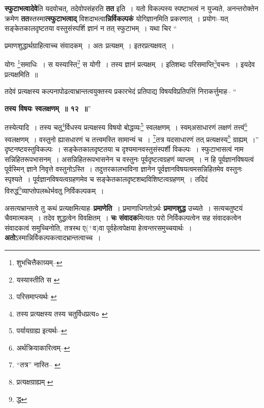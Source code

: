 \documentclass[article,12pt,a4paper]{memoir}
\newcommand{\add}[1]{($^{+}$#1)}
\begin{document}
	  \pstart \textbf{स्फुटाभत्वादेवे}ति यदवोचत्, तदेवोपसंहरति \textbf{तत} इति । यतो विकल्पस्य स्पष्टाभत्वं न युज्यते, अनन्तरोक्तेन क्रमेण \textbf{तत}स्तस्मा\textbf{त्स्फुटाभत्वाद्} विशदाभत्वा\textbf{न्निर्विकल्पकं} योगिज्ञानमिति प्रकरणात् । प्रयोगः--यत् सङ्केतकालदृष्टतया वस्तुसंस्पर्शि ज्ञानं न तत् स्फुटाभम् । यथा चिर \leavevmode{} “
	  
	प्रमाणशुद्धार्थग्राहित्वाच्च संवादकम् । अतः प्रत्यक्षम् । इतरप्रत्यक्षवत् । 
	  
	योगः \footnote{शुभचित्तैकाग्र्यम्--\cite{dp-msD-n}}समाधिः । स यस्यास्ति\footnote{यस्यास्तीति स \cite{dp-msC}} स योगी । तस्य ज्ञानं प्रत्यक्षम् । इतिशब्दः परिसमाप्ति\footnote{परिसमाप्त्यर्थः \cite{dp-msA} \cite{dp-edP} \cite{dp-edH} \cite{dp-edE} \cite{dp-edN}}वचनः । इयदेव प्रत्यक्षमिति ॥ 
	  
	तदेवं प्रत्यक्षस्य कल्पनापोढत्वाभ्रान्तत्वयुक्तस्य प्रकारभेदं प्रतिपाद्य विषयविप्रतिपत्तिं निराकर्त्तुमाह-- “
	  
	\textbf{तस्य विषयः स्वलक्षणम् ॥ १२ ॥}” 
	  
	तस्येत्यादि । तस्य चतु\footnote{तस्य प्रत्यक्षस्य \cite{dp-msC} तस्य चतुर्विधप्रत्य० \cite{dp-msA} \cite{dp-edP} \cite{dp-edH} \cite{dp-edE} \cite{dp-edN}}र्विधस्य प्रत्यक्षस्य विषयो बोद्धव्यः\footnote{पर्यायग्राह्य इत्यर्थः--\cite{dp-msD-n}} स्वलक्षणम् । स्वम्असाधारणं लक्षणं तत्त्वं\footnote{अर्थक्रियाकारित्वम्--\cite{dp-msD-n}} स्वलक्षणम् । वस्तुनो ह्यासधारणं च तत्त्वमस्ति सामान्यं च । \footnote{“तत्र” नास्ति--\cite{dp-msA} \cite{dp-msB} \cite{dp-msD} \cite{dp-edP} \cite{dp-edH} \cite{dp-edE}}तत्र यदसाधारणं तत् प्रत्यक्षस्य\footnote{प्रत्यक्षग्राह्यम् \cite{dp-msA} \cite{dp-msB} \cite{dp-edP} \cite{dp-edH} \cite{dp-edE}} ग्राह्यम् ।” दृष्टनष्टवस्तुविकल्पः । सङ्केतकालदृष्टतया च दृश्यमानवस्तुसंस्पर्शी विकल्पः । स्फुटाभासत्वं नाम सन्निहितरूपभासनम् । असन्निहितरूपभासनेन च वस्तुनः पूर्वदृष्टत्वग्रहणं व्याप्तम् । न हि पूर्वज्ञानविषयत्वं पूर्वस्मिन् ज्ञाने निवृत्ते वस्तुनोऽस्ति । तदुत्तरकालभाविना ज्ञानेन पूर्वज्ञानविषयत्वमसन्निहितमेव वस्तुनः स्पृश्यते । पूर्वज्ञानविषयत्वग्रहणमेव च सङ्केतकालदृष्टशब्दविशिष्टत्वग्रहणम् । तदिदं विरुद्धं\footnote{द्ध}व्याप्तोपलब्धेर्भवतु निर्विकल्पकम् ।
	\pend
      

	  \pstart असत्यभ्रान्तत्वे तु कथं प्रत्यक्षमित्याह--\textbf{प्रमाणेति} । प्रमाणाधिगतोऽर्थः \textbf{प्रमाणशुद्ध} उच्यते । सत्यचतुष्टयं चैवमात्मकम् । तदेव शुद्धत्वेन विवक्षितम् । \textbf{चः} \leavevmode{} \textbf{संवादक}मित्यतः परो निर्विकल्पत्वेन सह संवादकत्वेन संवादकत्वं समुच्चिनोति, तत्रस्थ ए\add{व}वा पूर्वहेत्वपेक्षया हेत्वन्तरसमुच्चयार्थः । \textbf{अतो}ऽस्मान्निर्विकल्पकत्वादभ्रान्तत्वाच्च ।
	\pend
      
\end{document}
